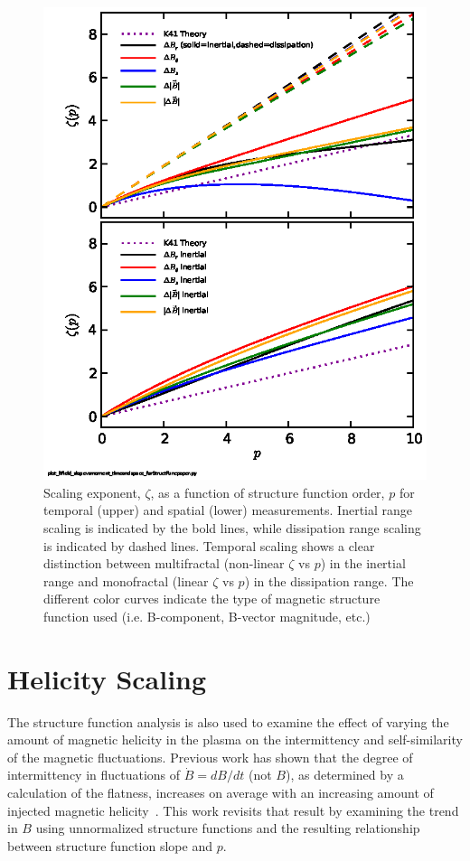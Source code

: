 \documentclass[preprint2]{aastex}
\begin{document}
\begin{figure}
\includegraphics[width={\columnwidth}]{fig4.eps}
\caption{\label{fig:slopevsmom} Scaling exponent, $\zeta$, as a function of structure function order, $p$ for temporal (upper) and spatial (lower) measurements. Inertial range scaling is indicated by the bold lines, while dissipation range scaling is indicated by dashed lines. Temporal scaling shows a clear distinction between multifractal (non-linear $\zeta$ vs $p$) in the inertial range and monofractal (linear $\zeta$ vs $p$) in the dissipation range. The different color curves indicate the type of magnetic structure function used (i.e. B-component, B-vector magnitude, etc.) }
\end{figure}

\section{Helicity Scaling}

The structure function analysis is also used to examine the effect of varying the amount of magnetic helicity in the plasma on the intermittency and self-similarity of the magnetic fluctuations. Previous work has shown that the degree of intermittency in fluctuations of $\dot{B}=dB/dt$ (not $B$), as determined by a calculation of the flatness, increases on average with an increasing amount of injected magnetic helicity~\citep{schaffner2014b}. This work revisits that result by examining the trend in $B$ using unnormalized structure functions and the resulting relationship between structure function slope and $p$. 
\end{document}
